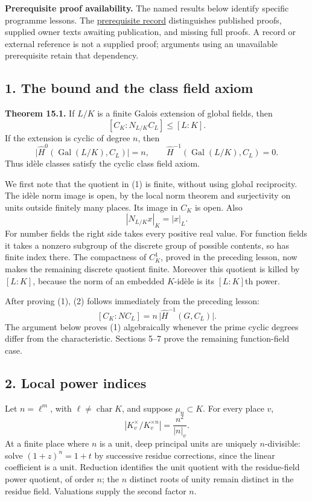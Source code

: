 \documentclass[11pt,a4paper]{article}
\begin{document}
\textbf{Prerequisite proof availability.} The named results below
identify specific programme lessons. The
\href{https://kokunoyumeto.github.io/open-math-courses/courses/NT-CFT/proof-dependencies.html\#lesson-15}{prerequisite
record} distinguishes published proofs, supplied owner texts awaiting
publication, and missing full proofs. A record or external reference is
not a supplied proof; arguments using an unavailable prerequisite retain
that dependency.

\subsection{1. The bound and the class field
axiom}\label{the-bound-and-the-class-field-axiom}

\textbf{Theorem 15.1.} If \(L/K\) is a finite Galois extension of global
fields, then \[
[C_K:N_{L/K}C_L]\leq [L:K].
\tag{1}
\] If the extension is cyclic of degree \(n\), then \[
\bigl|\widehat H^0(\operatorname{Gal}(L/K),C_L)\bigr|=n,
\qquad
\widehat H^{-1}(\operatorname{Gal}(L/K),C_L)=0.
\tag{2}
\] Thus idèle classes satisfy the cyclic class field axiom.

We first note that the quotient in (1) is finite, without using global
reciprocity. The idèle norm image is open, by the local norm theorem and
surjectivity on units outside finitely many places. Its image in \(C_K\)
is open. Also \[
|N_{L/K}x|_K=|x|_L.
\tag{3}
\] For number fields the right side takes every positive real value. For
function fields it takes a nonzero subgroup of the discrete group of
possible contents, so has finite index there. The compactness of
\(C_K^1\), proved in the preceding lesson, now makes the remaining
discrete quotient finite. Moreover this quotient is killed by \([L:K]\),
because the norm of an embedded \(K\)-idèle is its \([L:K]\)th power.

After proving (1), (2) follows immediately from the preceding lesson: \[
[C_K:NC_L]
=n\,\bigl|\widehat H^{-1}(G,C_L)\bigr|.
\tag{4}
\] The argument below proves (1) algebraically whenever the prime cyclic
degrees differ from the characteristic. Sections 5--7 prove the
remaining function-field case.

\subsection{2. Local power indices}\label{local-power-indices}

Let \(n=\ell^m\), with \(\ell\ne\operatorname{char}K\), and suppose
\(\mu_n\subset K\). For every place \(v\), \[
|K_v^\times/K_v^{\times n}|=\frac{n^2}{|n|_v}.
\tag{5}
\] At a finite place where \(n\) is a unit, deep principal units are
uniquely \(n\)-divisible: solve \((1+z)^n=1+t\) by successive residue
corrections, since the linear coefficient is a unit. Reduction
identifies the unit quotient with the residue-field power quotient, of
order \(n\); the \(n\) distinct roots of unity remain distinct in the
residue field. Valuations supply the second factor \(n\).
\end{document}
